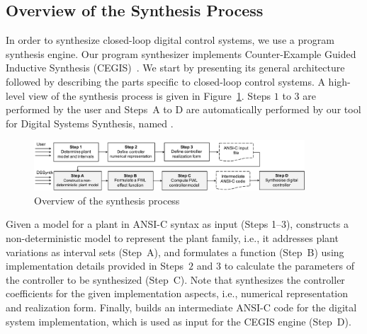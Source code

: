 \documentclass[final]{sig-alternate-05-2015}
\begin{document}
\subsection{Overview of the Synthesis Process}
\label{verification-flow}

In order to synthesize closed-loop digital control systems, we use a program
synthesis engine.  Our program synthesizer implements Counter-Example Guided
Inductive Synthesis (CEGIS)~\cite{sketch}.  We start by presenting its
general architecture followed by describing the parts specific to
closed-loop control systems.  A high-level view of the synthesis process is
given in Figure~\ref{DSSynth_process}.  Steps $1$ to $3$ are performed by
the user and Steps~A to D are automatically performed by our tool for
Digital Systems Synthesis, named \tool.
%

\begin{figure}[t]
\centering
\includegraphics[width=0.9\textwidth]{figures/verification-flow.pdf}
\vspace{0.1cm}
\caption{Overview of the synthesis process\label{DSSynth_process}}
\end{figure}


Given a model for a plant in ANSI-C syntax as input (Steps 1--3), \tool
constructs a non-deterministic model to represent the plant family,
i.e., it addresses plant variations as interval sets (Step~A),
and formulates a function (Step~B) using implementation details provided in
Steps~$2$ and $3$ to calculate the parameters of the controller to be
synthesized (Step~C).  Note that \tool synthesizes the controller 
coefficients for the given implementation aspects, i.e., numerical
representation and realization form.  Finally, \tool builds an intermediate 
ANSI-C code for the digital system implementation, which is used as input 
for the CEGIS engine (Step~D).
\end{document}
